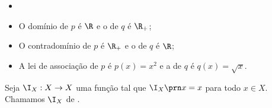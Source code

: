 \begin{solution}
\begin{itemize}
	\item[]
	\vspace{3mm}
	\item O domínio de $p$ é $\R$ e o de $q$ é $\R_+$;
	\item O contradomínio de $p$ é $\R_+$ e o de $q$ é $\R$;
	\item A lei de associação de $p$ é $p(x)=x^2$ e a de $q$ é $q(x)=\sqrt x$.
\end{itemize}
\end{solution}

\begin{definition}
Seja $\I_X : X \to X $ uma função tal que $\I_X \prn x = x$ para todo $x \in X$. Chamamos $\I_X$ de .
\end{definition}